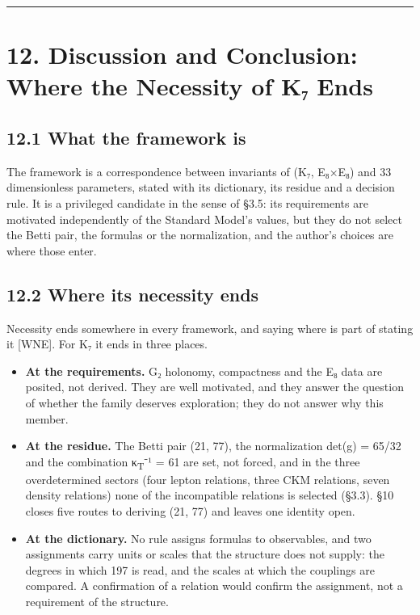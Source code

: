 \documentclass[11pt,a4paper]{article}
\begin{document}
\begin{center}\rule{\linewidth}{0.5pt}\end{center}

\section{12. Discussion and Conclusion: Where the Necessity of K₇ Ends}\label{discussion-and-conclusion-where-the-necessity-of-kux2087-ends}

\subsection{12.1 What the framework is}\label{what-the-framework-is}

The framework is a correspondence between invariants of (K₇, E₈×E₈) and 33 dimensionless parameters, stated with its dictionary, its residue and a decision rule. It is a privileged candidate in the sense of §3.5: its requirements are motivated independently of the Standard Model's values, but they do not select the Betti pair, the formulas or the normalization, and the author's choices are where those enter.

\subsection{12.2 Where its necessity ends}\label{where-its-necessity-ends}

Necessity ends somewhere in every framework, and saying where is part of stating it {[}WNE{]}. For K₇ it ends in three places.

\begin{itemize}
\tightlist
\item
  \textbf{At the requirements.} G₂ holonomy, compactness and the E₈ data are posited, not derived. They are well motivated, and they answer the question of whether the family deserves exploration; they do not answer why this member.
\item
  \textbf{At the residue.} The Betti pair (21, 77), the normalization det(g) = 65/32 and the combination κ\textsubscript{T}⁻¹ = 61 are set, not forced, and in the three overdetermined sectors (four lepton relations, three CKM relations, seven density relations) none of the incompatible relations is selected (§3.3). §10 closes five routes to deriving (21, 77) and leaves one identity open.
\item
  \textbf{At the dictionary.} No rule assigns formulas to observables, and two assignments carry units or scales that the structure does not supply: the degrees in which 197 is read, and the scales at which the couplings are compared. A confirmation of a relation would confirm the assignment, not a requirement of the structure.
\end{itemize}
\end{document}
